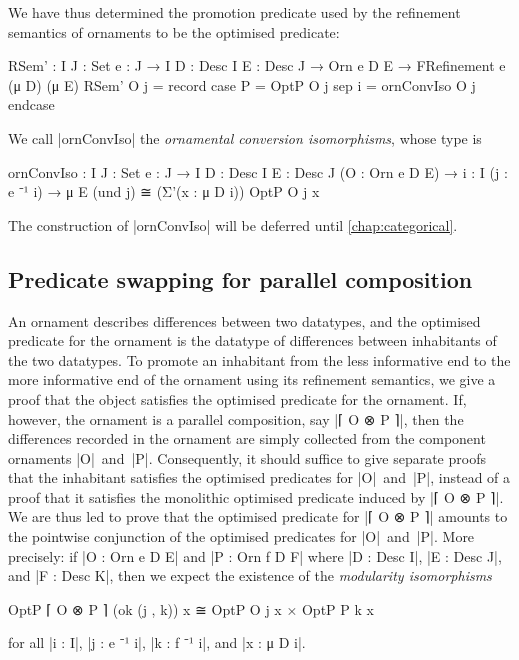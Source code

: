 We have thus determined the promotion predicate used by the refinement semantics of ornaments to be the optimised predicate:
\begin{code}
RSem' :  {I J : Set} {e : J → I} {D : Desc I} {E : Desc J} →
         Orn e D E → FRefinement e (μ D) (μ E)
RSem' O j = record  case  P  = OptP O j
                    sep   i  = ornConvIso O j endcase
\end{code}
We call |ornConvIso| the \emph{ornamental conversion isomorphisms}, whose type is
\begin{code}
ornConvIso :
  {I J : Set} {e : J → I} {D : Desc I} {E : Desc J} (O : Orn e D E) →
  {i : I} (j : e ⁻¹ i) → μ E (und j) ≅ (Σ'(x : μ D i)) OptP O j x
\end{code}
The construction of |ornConvIso| will be deferred until \autoref{chap:categorical}.

\subsection{Predicate swapping for parallel composition}
\label{sec:predicate-swapping}

An ornament describes differences between two datatypes, and the optimised predicate for the ornament is the datatype of differences between inhabitants of the two datatypes.
To promote an inhabitant from the less informative end to the more informative end of the ornament using its refinement semantics, we give a proof that the object satisfies the optimised predicate for the ornament.
If, however, the ornament is a parallel composition, say |⌈ O ⊗ P ⌉|, then the differences recorded in the ornament are simply collected from the component ornaments |O|~and~|P|.
Consequently, it should suffice to give separate proofs that the inhabitant satisfies the optimised predicates for |O|~and~|P|, instead of a proof that it satisfies the monolithic optimised predicate induced by |⌈ O ⊗ P ⌉|.
We are thus led to prove that the optimised predicate for |⌈ O ⊗ P ⌉| amounts to the pointwise conjunction of the optimised predicates for |O|~and~|P|.
More precisely: if |O : Orn e D E| and |P : Orn f D F| where |D : Desc I|, |E : Desc J|, and |F : Desc K|, then we expect the existence of the \emph{modularity isomorphisms}
\begin{code}
OptP ⌈ O ⊗ P ⌉ (ok (j , k)) x ≅ OptP O j x × OptP P k x
\end{code}
for all |i : I|, |j : e ⁻¹ i|, |k : f ⁻¹ i|, and |x : μ D i|.

